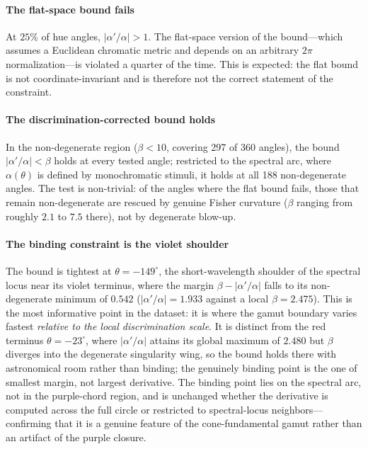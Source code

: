 \documentclass[preprint,12pt,authoryear]{elsarticle}
\theoremstyle{plain}
\theoremstyle{definition}
\theoremstyle{remark}
\begin{document}
\paragraph{The flat-space bound fails}
At $25\%$ of hue angles, $|\alpha'/\alpha|>1$. The flat-space version of the bound---which assumes a Euclidean chromatic metric and depends on an arbitrary $2\pi$ normalization---is violated a quarter of the time. This is expected: the flat bound is not coordinate-invariant and is therefore not the correct statement of the constraint.

\paragraph{The discrimination-corrected bound holds}
In the non-degenerate region ($\beta<10$, covering 297 of 360 angles), the bound $|\alpha'/\alpha|<\beta$ holds at every tested angle; restricted to the spectral arc, where $\alpha(\theta)$ is defined by monochromatic stimuli, it holds at all 188 non-degenerate angles. The test is non-trivial: of the angles where the flat bound fails, those that remain non-degenerate are rescued by genuine Fisher curvature ($\beta$ ranging from roughly $2.1$ to $7.5$ there), not by degenerate blow-up.

\paragraph{The binding constraint is the violet shoulder}
The bound is tightest at $\theta=-149^\circ$, the short-wavelength shoulder of the spectral locus near its violet terminus, where the margin $\beta-|\alpha'/\alpha|$ falls to its non-degenerate minimum of $0.542$ ($|\alpha'/\alpha|=1.933$ against a local $\beta=2.475$). This is the most informative point in the dataset: it is where the gamut boundary varies fastest \emph{relative to the local discrimination scale}. It is distinct from the red terminus $\theta=-23^\circ$, where $|\alpha'/\alpha|$ attains its global maximum of $2.480$ but $\beta$ diverges into the degenerate singularity wing, so the bound holds there with astronomical room rather than binding; the genuinely binding point is the one of smallest margin, not largest derivative. The binding point lies on the spectral arc, not in the purple-chord region, and is unchanged whether the derivative is computed across the full circle or restricted to spectral-locus neighbors---confirming that it is a genuine feature of the cone-fundamental gamut rather than an artifact of the purple closure.
\end{document}
